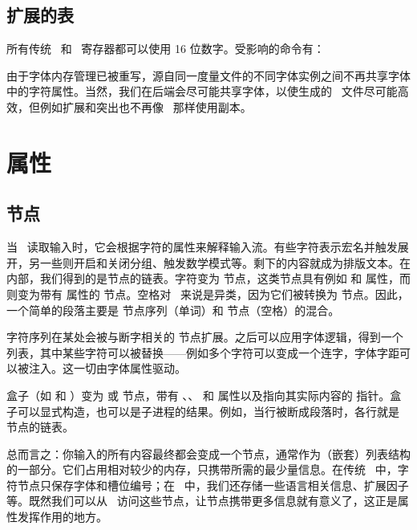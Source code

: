 \subsection{扩展的表}

所有传统 \TEX\ 和 \ETEX\ 寄存器都可以使用 16 位数字。受影响的命令有：

\begin{flushleft}
\end{flushleft}

由于字体内存管理已被重写，源自同一度量文件的不同字体实例之间不再共享字体中的字符属性。当然，我们在后端会尽可能共享字体，以使生成的 \PDF\ 文件尽可能高效，但例如扩展和突出也不再像 \PDFTEX\ 那样使用副本。

\section{属性}

\subsection{节点}


当 \TEX\ 读取输入时，它会根据字符的属性来解释输入流。有些字符表示宏名并触发展开，另一些则开启和关闭分组、触发数学模式等。剩下的内容就成为排版文本。在内部，我们得到的是节点的链表。字符变为  节点，这类节点具有例如  和  属性，而 \type{\kern 10pt} 则变为带有  属性的  节点。空格对 \TEX\ 来说是异类，因为它们被转换为  节点。因此，一个简单的段落主要是  节点序列（单词）和  节点（空格）的混合。

字符序列在某处会被与断字相关的  节点扩展。之后可以应用字体逻辑，得到一个列表，其中某些字符可以被替换——例如多个字符可以变成一个连字，字体字距可以被注入。这一切由字体属性驱动。

盒子（如  和 ）变为  或  节点，带有 、、 和  属性以及指向其实际内容的  指针。盒子可以显式构造，也可以是子进程的结果。例如，当行被断成段落时，各行就是  节点的链表。

总而言之：你输入的所有内容最终都会变成一个节点，通常作为（嵌套）列表结构的一部分。它们占用相对较少的内存，只携带所需的最少量信息。在传统 \TEX\ 中，字符节点只保存字体和槽位编号；在 \LUATEX\ 中，我们还存储一些语言相关信息、扩展因子等。既然我们可以从 \LUA\ 访问这些节点，让节点携带更多信息就有意义了，这正是属性发挥作用的地方。

